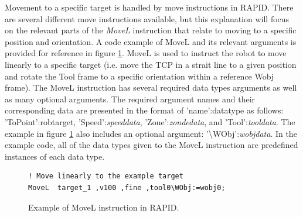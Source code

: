 \documentclass{cslthse-msc}
\begin{document}
Movement to a specific target is handled by move instructions in RAPID. There are several different move instructions available, but this explanation will focus on the relevant parts of the \textit{MoveL} \cite[Sec. 1.158]{ABB:rapid_instructions} instruction that relate to moving to a specific position and orientation. A code example of MoveL and its relevant arguments is provided for reference in figure \ref{fig:RAPID_movel}. MoveL is used to instruct the robot to move linearly to a specific target (i.e. move the TCP in a strait line to a given position and rotate the Tool frame to a specific orientation within a reference Wobj frame). The MoveL instruction has several required data types arguments as well as many optional arguments. The required argument names and their corresponding data are presented in the format of 'name':datatype as follows: 'ToPoint':robtarget, 'Speed':\textit{speeddata}, 'Zone':\textit{zondedata}, and 'Tool':\textit{tooldata}. The example in figure \ref{fig:RAPID_movel} also includes an optional argument: '\textbackslash WObj':\textit{wobjdata}. In the example code, all of the data types given to the MoveL instruction are predefined instances of each data type. 

\lstset{language=RAPID}
\begin{figure}[H]
\centering
\begin{lstlisting}
! Move linearly to the example target
MoveL  target_1 ,v100 ,fine ,tool0\WObj:=wobj0;
\end{lstlisting}
\caption{Example of MoveL instruction in RAPID.}
\label{fig:RAPID_movel}
\end{figure}
\end{document}
